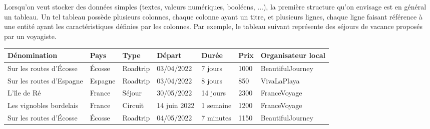 \documentclass[11pt,a4paper,french,twoside]{PMCours}
\begin{document}
Lorsqu'on veut stocker des données simples (textes, valeurs numériques, booléens, ...), la première structure qu'on envisage est en général un tableau. Un tel tableau possède plusieurs colonnes, chaque colonne ayant un titre, et plusieurs lignes, chaque ligne faisant référence à une entité ayant les caractéristiques définies par les colonnes. Par exemple, le tableau suivant représente des séjours de vacance proposés par un voyagiste.

\begin{center}
\begin{tabular}[c]{l|l|l|l|l|l|l}
Dénomination & Pays & Type & Départ & Durée & Prix & Organisateur local \\ \hline
Sur les routes d'Écosse & Écosse & Roadtrip & 03/04/2022 & 7 jours & 1000 & BeautifulJourney \\
Sur les routes d'Espagne & Espagne & Roadtrip & 03/04/2022 & 8 jours & 850 & VivaLaPlaya \\
L'île de Ré & France & Séjour & 30/05/2022 & 14 jours & 2300 & FranceVoyage \\
Les vignobles bordelais & France & Circuit & 14 juin 2022 & 1 semaine & 1200 & FranceVoyage \\
Sur les routes d'Écosse & Écosse & Roadtrip & 04/05/2022 & 7 minutes & 1150 & BeautifulJourney
\end{tabular}
\end{center}
\end{document}
